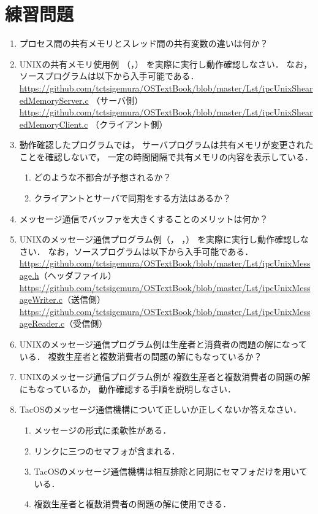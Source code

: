 \section*{練習問題}
\begin{enumerate}
\renewcommand{\labelenumi}{\tt \arabic{chapter}.\arabic{enumi}}
 \setlength{\leftskip}{1em}

\item プロセス間の共有メモリとスレッド間の共有変数の違いは何か？

\item UNIXの共有メモリ使用例
（，）
を実際に実行し動作確認しなさい．
なお，ソースプログラムは以下から入手可能である． \\
\url{https://github.com/tctsigemura/OSTextBook/blob/master/Lst/ipcUnixShearedMemoryServer.c} （サーバ側）\\
\url{https://github.com/tctsigemura/OSTextBook/blob/master/Lst/ipcUnixShearedMemoryClient.c} （クライアント側）

\item 動作確認したプログラムでは，
サーバプログラムは共有メモリが変更されたことを確認しないで，
一定の時間間隔で共有メモリの内容を表示している．
\begin{enumerate}
\item どのような不都合が予想されるか？
\item クライアントとサーバで同期をする方法はあるか？
\end{enumerate}

\item メッセージ通信でバッファを大きくすることのメリットは何か？

\item UNIXのメッセージ通信プログラム例（，
，）
を実際に実行し動作確認しなさい．
なお，ソースプログラムは以下から入手可能である． \\
\url{https://github.com/tctsigemura/OSTextBook/blob/master/Lst/ipcUnixMessage.h}（ヘッダファイル）\\
\url{https://github.com/tctsigemura/OSTextBook/blob/master/Lst/ipcUnixMessageWriter.c}（送信側）\\
\url{https://github.com/tctsigemura/OSTextBook/blob/master/Lst/ipcUnixMessageReader.c}（受信側）

\item UNIXのメッセージ通信プログラム例は生産者と消費者の問題の解になっている．
複数生産者と複数消費者の問題の解にもなっているか？

\item UNIXのメッセージ通信プログラム例が
複数生産者と複数消費者の問題の解にもなっているか，
動作確認する手順を説明しなさい．

\item TacOSのメッセージ通信機構について正しいか正しくないか答えなさい．
  \begin{enumerate}
  \item メッセージの形式に柔軟性がある．
  \item リンクに三つのセマフォが含まれる．
  \item TacOSのメッセージ通信機構は相互排除と同期にセマフォだけを用いている．
  \item 複数生産者と複数消費者の問題の解に使用できる．
  \end{enumerate}
\end{enumerate}

